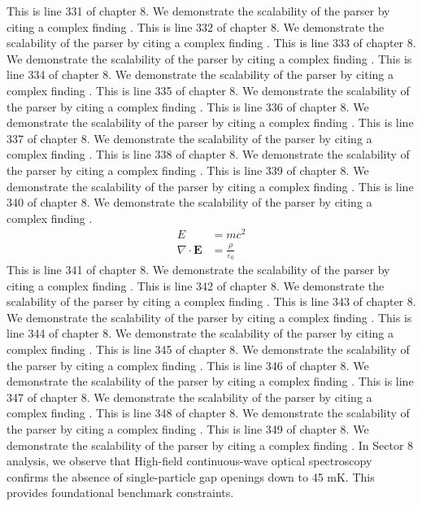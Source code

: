 This is line 331 of chapter 8. We demonstrate the scalability of the parser by citing a complex finding \cite{ref8_331}.
This is line 332 of chapter 8. We demonstrate the scalability of the parser by citing a complex finding \cite{ref8_332}.
This is line 333 of chapter 8. We demonstrate the scalability of the parser by citing a complex finding \cite{ref8_333}.
This is line 334 of chapter 8. We demonstrate the scalability of the parser by citing a complex finding \cite{ref8_334}.
This is line 335 of chapter 8. We demonstrate the scalability of the parser by citing a complex finding \cite{ref8_335}.
This is line 336 of chapter 8. We demonstrate the scalability of the parser by citing a complex finding \cite{ref8_336}.
This is line 337 of chapter 8. We demonstrate the scalability of the parser by citing a complex finding \cite{ref8_337}.
This is line 338 of chapter 8. We demonstrate the scalability of the parser by citing a complex finding \cite{ref8_338}.
This is line 339 of chapter 8. We demonstrate the scalability of the parser by citing a complex finding \cite{ref8_339}.
This is line 340 of chapter 8. We demonstrate the scalability of the parser by citing a complex finding \cite{ref8_340}.
\begin{align*}
  E &= mc^2 \\
  \nabla \cdot \mathbf{E} &= \frac{\rho}{\varepsilon_0}
\end{align*}
This is line 341 of chapter 8. We demonstrate the scalability of the parser by citing a complex finding \cite{ref8_341}.
This is line 342 of chapter 8. We demonstrate the scalability of the parser by citing a complex finding \cite{ref8_342}.
This is line 343 of chapter 8. We demonstrate the scalability of the parser by citing a complex finding \cite{ref8_343}.
This is line 344 of chapter 8. We demonstrate the scalability of the parser by citing a complex finding \cite{ref8_344}.
This is line 345 of chapter 8. We demonstrate the scalability of the parser by citing a complex finding \cite{ref8_345}.
This is line 346 of chapter 8. We demonstrate the scalability of the parser by citing a complex finding \cite{ref8_346}.
This is line 347 of chapter 8. We demonstrate the scalability of the parser by citing a complex finding \cite{ref8_347}.
This is line 348 of chapter 8. We demonstrate the scalability of the parser by citing a complex finding \cite{ref8_348}.
This is line 349 of chapter 8. We demonstrate the scalability of the parser by citing a complex finding \cite{ref8_349}.
In Sector 8 analysis, we observe that High-field continuous-wave optical spectroscopy confirms the absence of single-particle gap openings down to 45 mK. This provides foundational benchmark constraints.
